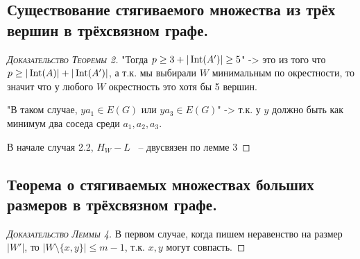 \subsection{Существование стягиваемого множества из трёх вершин в трёхсвязном графе.}



\begin{proof}[\normalfont\textsc{Доказательство Теоремы 2}]
	"Тогда $p \geq 3 + |\operatorname{Int}(A')| \geq 5$" -> это из того что $p \geq |\operatorname{Int}(A)| + |\operatorname{Int}(A')|$, а т.к. мы выбирали $W$ минимальным по окрестности, то значит что у любого $W$ окрестность это хотя бы 5 вершин.

	"В таком случае, $ya_1 \in E(G)$ или $ya_3 \in E(G)$" -> т.к. у $y$ должно быть как минимум два соседа среди  $a_1, a_2, a_3$.

	В начале случая 2.2, $H_W - L$ ~-- двусвязен по лемме 3
\end{proof}


\subsection{Теорема о стягиваемых множествах больших размеров в трёхсвязном графе.}


\begin{proof}[\normalfont\textsc{Доказательство Леммы 4}]
	В первом случае, когда пишем неравенство на размер $|W'|$, то $|W \setminus \{x, y\}| \leqslant m- 1$, т.к.  $x, y$ могут совпасть.
\end{proof}



